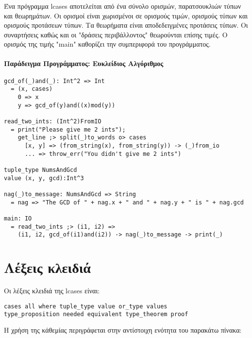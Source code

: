 \documentclass[diploma]{softlab-thesis}
\begin{document}
Ένα πρόγραμμα lcases αποτελείται από ένα σύνολο ορισμών, παρατσουκλιών τύπων
και θεωρημάτων. Οι ορισμοί είναι χωρισμένοι σε ορισμούς τιμών, ορισμούς τύπων
και ορισμούς προτάσεων τύπων. Τα θεωρήματα είναι αποδεδειγμένες προτάσεις
τύπων. Οι συναρτήσεις καθώς και οι "δράσεις περιβάλλοντος" θεωρούνται επίσης
τιμές.  Ο ορισμός της τιμής "main" καθορίζει την συμπεριφορά του προγράμματος.

\paragraph{Παράδειγμα Προγράμματος: Ευκλείδιος Αλγόριθμος}
\begin{verbatim}
gcd_of(_)and(_): Int^2 => Int
  = (x, cases)
    0 => x
    y => gcd_of(y)and((x)mod(y))

read_two_ints: (Int^2)FromIO
  = print("Please give me 2 ints");
    get_line ;> split(_)to_words o> cases
      [x, y] => (from_string(x), from_string(y)) -> (_)from_io
      ... => throw_err("You didn't give me 2 ints")

tuple_type NumsAndGcd
value (x, y, gcd):Int^3

nag(_)to_message: NumsAndGcd => String
  = nag => "The GCD of " + nag.x + " and " + nag.y + " is " + nag.gcd

main: IO
  = read_two_ints ;> (i1, i2) =>
    (i1, i2, gcd_of(i1)and(i2)) -> nag(_)to_message -> print(_)
\end{verbatim}

\newpage
\section{Λέξεις κλειδιά}

Οι λέξεις κλειδιά της lcases είναι:
\begin{verbatim}
cases all where tuple_type value or_type values
type_proposition needed equivalent type_theorem proof
\end{verbatim}
Η χρήση της κάθεμίας περιγράφεται στην αντίστοιχη ενότητα του παρακάτω πίνακα:
\end{document}
